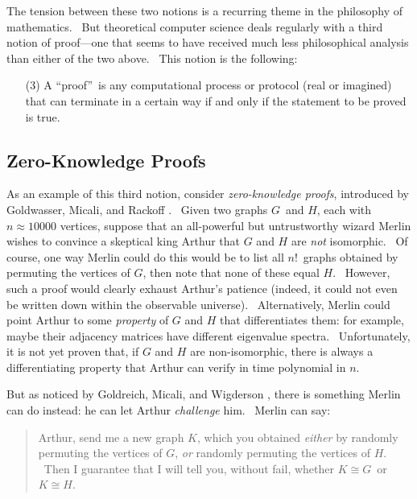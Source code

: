 \documentclass[11pt,onecolumn]{article}%
\begin{document}
The tension between these two notions is a recurring theme in the philosophy
of mathematics. \ But theoretical computer science deals regularly with a
third notion of proof---one that seems to have received much less
philosophical analysis than either of the two above. \ This notion is the following:

\begin{enumerate}
\item[(3)] A \textquotedblleft proof\textquotedblright\ is any computational
process or protocol (real or imagined) that can terminate in a certain way if
and only if the statement to be proved is true.
\end{enumerate}

\subsection{Zero-Knowledge Proofs\label{ZKP}}

As an example of this third notion, consider \textit{zero-knowledge proofs},
introduced by Goldwasser, Micali, and Rackoff \cite{gmr}. \ Given two graphs
$G$\ and $H$, each with $n\approx10000$ vertices, suppose that an all-powerful
but untrustworthy wizard Merlin wishes to convince a skeptical king Arthur
that $G$ and $H$ are \textit{not} isomorphic. \ Of course, one way Merlin
could do this would be to list all $n!$\ graphs obtained by permuting the
vertices of $G$, then note that none of these equal $H$. \ However, such a
proof would clearly exhaust Arthur's patience (indeed, it could not even be
written down within the observable universe). \ Alternatively, Merlin could
point Arthur to some \textit{property} of $G$ and $H$ that differentiates
them: for example, maybe their adjacency matrices have different eigenvalue
spectra. \ Unfortunately, it is not yet proven that, if $G$ and $H$ are
non-isomorphic, there is always a differentiating property that Arthur can
verify in time polynomial in $n$.

But as noticed by Goldreich, Micali, and Wigderson \cite{gmw}, there is
something Merlin can do instead: he can let Arthur \textit{challenge} him.
\ Merlin can say:

\begin{quotation}
\noindent Arthur, send me a new graph $K$, which you obtained \textit{either}
by randomly permuting the vertices of $G$, \textit{or} randomly permuting the
vertices of $H$. \ Then I guarantee that I will tell you, without fail,
whether $K\cong G$\ or $K\cong H$.
\end{quotation}
\end{document}
